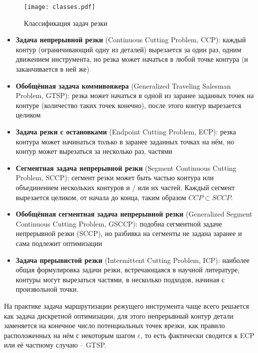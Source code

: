 \begin{figure}
  \centering
  \texttt{[image: classes.pdf]}
  \caption{Классификация задач резки}
  \label{fig:cut-classes}
\end{figure}

\begin{itemize}
  \item
  \textbf{Задача непрерывной резки}
  (Continuous Cutting Problem, CCP):
  каждый контур
  (ограничивающий одну из деталей)
  вырезается за один раз,
  одним движением инструмента,
  но резка может начаться в любой точке контура
  (и заканчивается в ней же)

  \item
  \textbf{Обобщённая задача коммивояжера}
  (Generalized Traveling Salesman Problem, GTSP):
  резка может начаться в одной из заранее
  заданных точек на контуре
  (количество таких точек конечно),
  после этого контур вырезается целиком

  \item
  \textbf{Задача резки с остановками}
  (Endpoint Cutting Problem, ECP):
  резка контура может начинаться только в
  заранее заданных точках на нём,
  но контур может вырезаться за несколько раз,
  частями

  \item
  \textbf{Сегментная задача непрерывной резки}
  (Segment Continuous Cutting Problem, SCCP):
  сегмент резки может быть частью контура
  или объединением нескольких контуров
  и / или их частей.
  Каждый сегмент вырезается целиком,
  от начала до конца,
  таким образом
  $ CCP \subset SCCP$.

  \item
  \textbf{Обобщённая сегментная задача непрерывной резки}
  (Generalized Segment Continuous Cutting Problem, GSCCP):
  подобна сегментной задаче непрерывной резки
  (SCCP),
  но разбивка на сегменты не задана заранее
  и сама подлежит оптимизации

  \item
  \textbf{Задача прерывистой резки}
  (Intermittent Cutting Problem, ICP):
  наиболее общая формулировка задачи резки,
  встречающаяся в научной литературе,
  контуры могут вырезаться частями,
  в несколько подходов,
  начиная с произвольной точки.
\end{itemize}

На практике
задача маршрутизации режущего инструмента
чаще всего решается
как задача дискретной оптимизации,
для этого непрерывный контур детали
заменяется на конечное число
потенциальных точек врезки,
как правило расположенных на нём
с некоторым шагом
$\varepsilon$,
то есть фактически сводится к
ECP
или её частному случаю --
GTSP.

